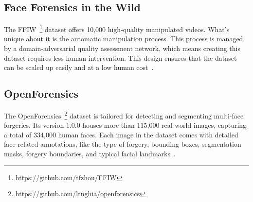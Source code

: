 \subsection{Face Forensics in the Wild}
The \ac{FFIW}~\footnote{https://github.com/tfzhou/FFIW} dataset offers 10,000 high-quality
manipulated videos. What's unique about it is the automatic manipulation process. This
process is managed by a domain-adversarial quality assessment network, which means creating
this dataset requires less human intervention. This design ensures that the dataset can
be scaled up easily and at a low human cost~\cite{Zhou_2021_CVPR}.

\subsection{OpenForensics}
The OpenForensics~\footnote{https://github.com/ltnghia/openforensics} dataset is tailored for detecting and segmenting multi-face forgeries.
Its version 1.0.0 houses more than 115,000 real-world images, capturing a total of 334,000 human faces.
Each image in the dataset comes with detailed face-related annotations, like the type
of forgery, bounding boxes, segmentation masks, forgery boundaries, and typical facial
landmarks~\cite{ltnghia-ICCV2021}.


